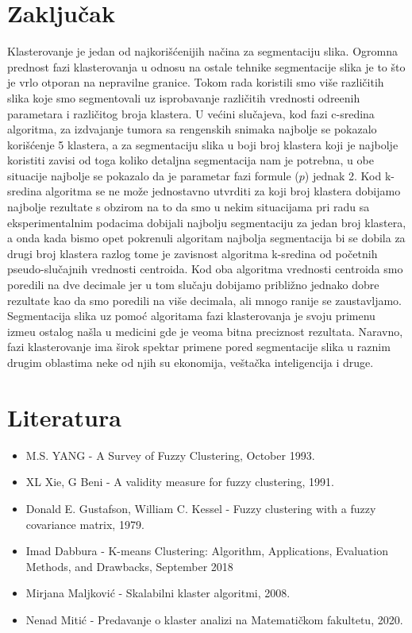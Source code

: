 \documentclass{article}
\begin{document}
\section{\selectfont Zaklju\v{c}ak}

Klasterovanje je jedan od najkori\v{s}\'{c}enijih na\v{c}ina za segmentaciju slika. Ogromna prednost fazi klasterovanja u odnosu na ostale tehnike segmentacije slika je to \v{s}to je vrlo otporan na nepravilne granice. Tokom rada koristili smo vi\v{s}e razli\v{c}itih slika koje smo segmentovali uz isprobavanje razli\v{c}itih vrednosti odre\dj enih parametara i razli\v{c}itog broja klastera. U ve\'{c}ini slu\v{c}ajeva, kod fazi c-sredina algoritma, za izdvajanje tumora sa rengenskih snimaka najbolje se pokazalo kori\v{s}\'{c}enje 5 klastera, a za segmentaciju slika u boji broj klastera koji je najbolje koristiti zavisi od toga koliko detaljna segmentacija nam je potrebna, u obe situacije najbolje se pokazalo da je parametar fazi formule ($p$) jednak 2. Kod k-sredina algoritma se ne mo\v{z}e jednostavno utvrditi za koji broj klastera dobijamo najbolje rezultate s obzirom na to da smo u nekim situacijama pri radu sa eksperimentalnim podacima dobijali najbolju segmentaciju za jedan broj klastera, a onda kada bismo opet pokrenuli algoritam najbolja segmentacija bi se dobila za drugi broj klastera razlog tome je zavisnost algoritma k-sredina od po\v{c}etnih pseudo-slu\v{c}ajnih vrednosti centroida. Kod oba algoritma vrednosti centroida smo poredili na dve decimale jer u tom slu\v{c}aju dobijamo pribli\v{z}no jednako dobre rezultate kao da smo poredili na vi\v{s}e decimala, ali mnogo ranije se zaustavljamo. Segmentacija slika uz pomo\'{c} algoritama fazi klasterovanja je svoju primenu izme\dj u ostalog na\v{s}la u medicini gde je veoma bitna preciznost rezultata. Naravno, fazi klasterovanje ima \v{s}irok spektar primene pored segmentacije slika u raznim drugim oblastima neke od njih su ekonomija, ve\v{s}ta\v{c}ka inteligencija i druge.

\newpage
\section{\selectfont Literatura}

\selectfont
\begin{itemize}
\item M.S. YANG - A Survey of Fuzzy Clustering, October 1993.
\item XL Xie, G Beni - A validity measure for fuzzy clustering, 1991.
\item Donald E. Gustafson, William C. Kessel - Fuzzy clustering with a fuzzy covariance matrix, 1979.
\item Imad Dabbura - K-means Clustering: Algorithm, Applications, Evaluation Methods, and Drawbacks, September 2018
\selectfont
\item Mirjana Maljkovi\'{c} - Skalabilni klaster algoritmi, 2008.
\item Nenad Miti\'{c} - Predavanje o klaster analizi na Matemati\v{c}kom fakultetu, 2020.
\end{itemize}
\end{document}
